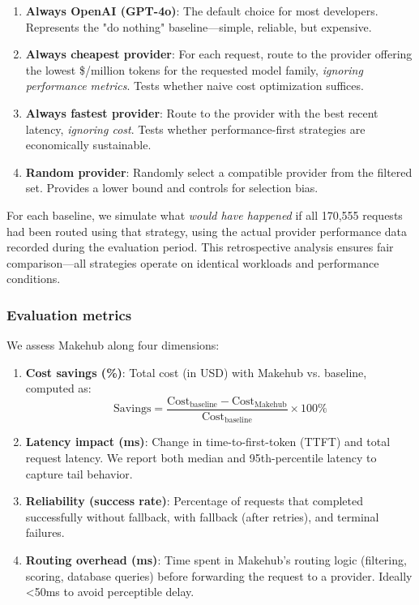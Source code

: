 \documentclass[english]{article}
\begin{document}
\begin{enumerate}
\item \textbf{Always OpenAI (GPT-4o)}: The default choice for most developers. Represents the "do nothing" baseline—simple, reliable, but expensive.

\item \textbf{Always cheapest provider}: For each request, route to the provider offering the lowest \$/million tokens for the requested model family, \emph{ignoring performance metrics}. Tests whether naive cost optimization suffices.

\item \textbf{Always fastest provider}: Route to the provider with the best recent latency, \emph{ignoring cost}. Tests whether performance-first strategies are economically sustainable.

\item \textbf{Random provider}: Randomly select a compatible provider from the filtered set. Provides a lower bound and controls for selection bias.
\end{enumerate}

For each baseline, we simulate what \emph{would have happened} if all 170,555 requests had been routed using that strategy, using the actual provider performance data recorded during the evaluation period. This retrospective analysis ensures fair comparison—all strategies operate on identical workloads and performance conditions.

\subsubsection{Evaluation metrics}

We assess Makehub along four dimensions:

\begin{enumerate}
\item \textbf{Cost savings (\%)}: Total cost (in USD) with Makehub vs. baseline, computed as:
  \[
  \text{Savings} = \frac{\text{Cost}_{\text{baseline}} - \text{Cost}_{\text{Makehub}}}{\text{Cost}_{\text{baseline}}} \times 100\%
  \]

\item \textbf{Latency impact (ms)}: Change in time-to-first-token (TTFT) and total request latency. We report both median and 95th-percentile latency to capture tail behavior.

\item \textbf{Reliability (success rate)}: Percentage of requests that completed successfully without fallback, with fallback (after retries), and terminal failures.

\item \textbf{Routing overhead (ms)}: Time spent in Makehub's routing logic (filtering, scoring, database queries) before forwarding the request to a provider. Ideally <50ms to avoid perceptible delay.
\end{enumerate}
\end{document}
